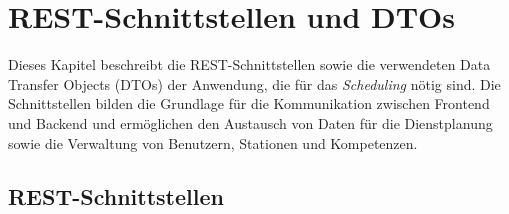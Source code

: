 
\chapter{REST-Schnittstellen und DTOs}
\label{sec:rest}
Dieses Kapitel beschreibt die REST-Schnittstellen sowie die verwendeten Data Transfer Objects (DTOs) der Anwendung, die für das \textit{Scheduling} nötig sind. Die Schnittstellen bilden die Grundlage für die Kommunikation zwischen Frontend und Backend und ermöglichen den Austausch von Daten für die Dienstplanung sowie die Verwaltung von Benutzern, Stationen und Kompetenzen.

\section{REST-Schnittstellen}

